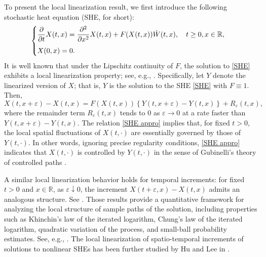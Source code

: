 \documentclass[11pt,reqno]{amsart}
\numberwithin{equation}{section}
\newcommand{\1}{{\bf 1}}
\newcommand{\2}{{\bf 2}}
\begin{document}
   To present the local linearization result, we first introduce the following stochastic heat equation (SHE, for short):
        \begin{equation}\label{SHE}
\begin{cases}
\vspace{6pt}
\displaystyle{\frac{\partial}{\partial t} X(t, x) =\frac{\partial^2}{\partial x^2} X(t, x) +   F(X(t,x)) \dot{W}(t, x), \quad t \ge 0, x \in \mathbb{R},}\\
\displaystyle{X(0, x) = 0.}
\end{cases}
\end{equation} 
It is well known that under  the Lipschitz continuity  of $F$, the solution to \eqref{SHE} exhibits a local  linearization property; see, e.g., \cite{FKM2015, H14}.  Specifically,   let    $Y$ denote the linearized version of $X$; that is,   $Y$ is the solution to the   SHE \eqref{SHE} with $F\equiv1$. Then, 
  \begin{equation}\label{SHE appro}
  X(t, x + \varepsilon) - X(t, x) = F(X(t, x)) \left\{Y(t, x + \varepsilon) - Y(t, x)\right\} + R_{\varepsilon}(t, x),
\end{equation}  
where  the remainder term $R_{\varepsilon}(t, x)$ tends to $0$   as $\varepsilon\to 0$ at a rate   faster than $Y(t, x + \varepsilon) -Y(t, x)$.   
The relation \eqref{SHE appro} implies that, for fixed $t>0$, the  local spatial  fluctuations  of    $X(t, \cdot)$ are essentially governed by those of  $Y(t, \cdot)$.   In other words,  ignoring precise regularity conditions,   \eqref{SHE appro} indicates  that $X(t, \cdot)$ is controlled by $Y(t, \cdot)$ in the sense of Gubinelli's theory of  controlled paths     \cite{G04}.  
  
A similar local linearization behavior holds for  temporal increments: for fixed $t>0$ and $x\in \mathbb R$, as $\varepsilon \downarrow 0$, the increment  $X(t+\varepsilon, x)-X(t, x)$ admits an analogous structure.  See \cite{KSXZ2013, HP15, WX2024, QWWX2025}. Those results provide a   quantitative framework for analyzing the local   structure   of   sample paths  of the solution, including properties such as     Khinchin's law of the iterated logarithm,  Chung's  law of the iterated logarithm,    quadratic variation  of the  process, and  small-ball probability estimates. See, e.g.,  \cite{CHKK19, DNP2025, Das2022, HK2017, KKM23}. 
  The local  linearization of spatio-temporal increments of   solutions  to nonlinear SHEs has been further  studied by  Hu and Lee in  \cite{HL2025}.
\end{document}
